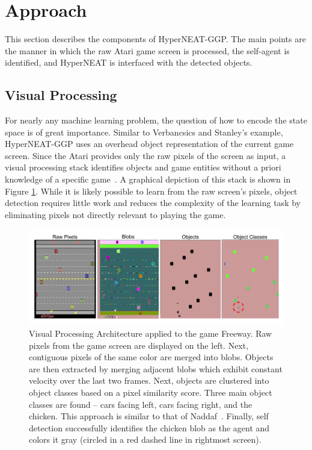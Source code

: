 \documentclass{sig-alternate}
\begin{document}
\section{Approach}
\label{sec:approach}
This section describes the components of HyperNEAT-GGP. The main points are the manner in which the raw Atari game screen is processed, the self-agent is identified, and HyperNEAT is interfaced with the detected objects. 

\subsection{Visual Processing}
For nearly any machine learning problem, the question of how to encode the state space is of great importance. Similar to Verbancsics and Stanley's example, HyperNEAT-GGP uses an overhead object representation of the current game screen. Since the Atari provides only the raw pixels of the screen as input, a visual processing stack identifies objects and game entities without a priori knowledge of a specific game~\cite{naddaf10}. A graphical depiction of this stack is shown in Figure \ref{fig:visproc}. While it is likely possible to learn from the raw screen's pixels, object detection requires little work and reduces the complexity of the learning task by eliminating pixels not directly relevant to playing the game.

\begin{figure}[htp]
\begin{center}
\includegraphics[width=\textwidth]{figures/AtariArch}
\end{center}
\caption{Visual Processing Architecture applied to the game Freeway. Raw pixels from the game screen are displayed on the left. Next, contiguous pixels of the same color are merged into blobs. Objects are then extracted by merging adjacent blobs which exhibit constant velocity over the last two frames. Next, objects are clustered into object classes based on a pixel similarity score. Three main object classes are found -- cars facing left, cars facing right, and the chicken. This approach is similar to that of Naddaf~\cite{naddaf10}. Finally, self detection successfully identifies the chicken blob as the agent and colors it gray (circled in a red dashed line in rightmost screen).}
\label{fig:visproc}
\end{figure}
\end{document}

